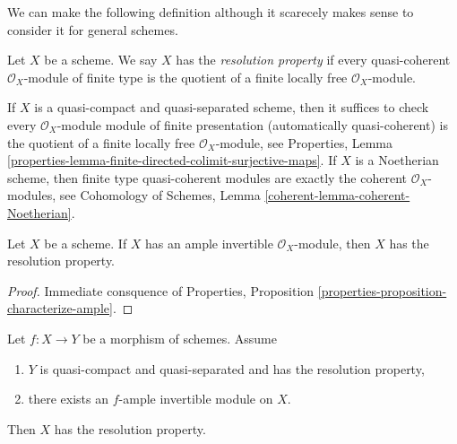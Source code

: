 \medskip\noindent
We can make the following definition although it scarecely makes
sense to consider it for general schemes.

\begin{definition}
\label{definition-resolution-property}
Let $X$ be a scheme. We say $X$ has the {\it resolution property}
if every quasi-coherent $\mathcal{O}_X$-module of finite type
is the quotient of a finite locally free $\mathcal{O}_X$-module.
\end{definition}

\noindent
If $X$ is a quasi-compact and quasi-separated scheme, then it suffices to check
every $\mathcal{O}_X$-module module of finite presentation (automatically
quasi-coherent) is the quotient of a finite locally free
$\mathcal{O}_X$-module, see Properties, Lemma
\ref{properties-lemma-finite-directed-colimit-surjective-maps}.
If $X$ is a Noetherian scheme, then finite type quasi-coherent modules
are exactly the coherent $\mathcal{O}_X$-modules, see
Cohomology of Schemes, Lemma \ref{coherent-lemma-coherent-Noetherian}.

\begin{lemma}
\label{lemma-resolution-property-ample}
Let $X$ be a scheme. If $X$ has an ample invertible $\mathcal{O}_X$-module,
then $X$ has the resolution property.
\end{lemma}

\begin{proof}
Immediate consquence of Properties, Proposition
\ref{properties-proposition-characterize-ample}.
\end{proof}

\begin{lemma}
\label{lemma-resolution-property-ample-relative}
Let $f : X \to Y$ be a morphism of schemes. Assume
\begin{enumerate}
\item $Y$ is quasi-compact and quasi-separated and has the resolution property,
\item there exists an $f$-ample invertible module on $X$.
\end{enumerate}
Then $X$ has the resolution property.
\end{lemma}

